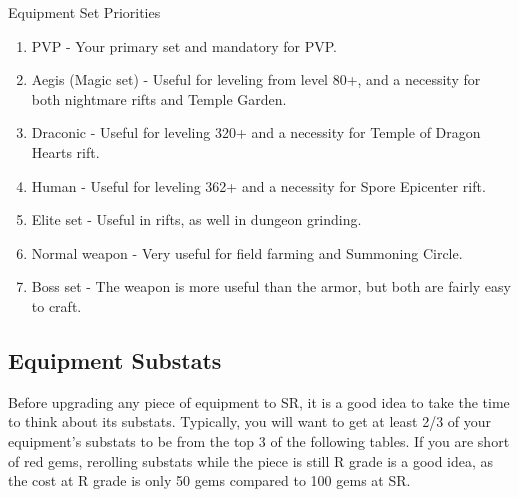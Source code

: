 \documentclass[]{article}
\begin{document}
Equipment Set Priorities
\begin{enumerate}
	\item PVP - Your primary set and mandatory for PVP.
	\item Aegis (Magic set) - Useful for leveling from level 80+, and a necessity for both nightmare rifts and Temple Garden.
	\item Draconic - Useful for leveling 320+ and a necessity for Temple of Dragon Hearts rift.
	\item Human - Useful for leveling 362+ and a necessity for Spore Epicenter rift.
	\item Elite set - Useful in rifts, as well in dungeon grinding.
	\item Normal weapon - Very useful for field farming and Summoning Circle.
	\item Boss set - The weapon is more useful than the armor, but both are fairly easy to craft.

\end{enumerate}

\subsection{Equipment Substats}

Before upgrading any piece of equipment to SR, it is a good idea to take the time to think about its substats.
Typically, you will want to get at least 2/3 of your equipment's substats to be from the top 3 of the following tables.
If you are short of red gems, rerolling substats while the piece is still R grade is a good idea, as the cost at R grade is only 50 gems compared to 100 gems at SR.
\end{document}
